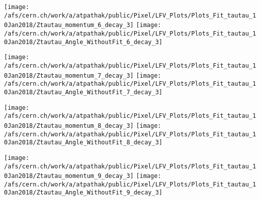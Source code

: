 \documentclass{beamer}
\begin{document}
\begin{frame}
\begin{normalsize}
\begin{center}
\texttt{[image: /afs/cern.ch/work/a/atpathak/public/Pixel/LFV\_Plots/Plots\_Fit\_tautau\_10Jan2018/Ztautau\_momentum\_6\_decay\_3]}
\texttt{[image: /afs/cern.ch/work/a/atpathak/public/Pixel/LFV\_Plots/Plots\_Fit\_tautau\_10Jan2018/Ztautau\_Angle\_WithoutFit\_6\_decay\_3]} 
\end{center}
\end{normalsize}
\end {frame}
\begin{frame}
\begin{normalsize}
\begin{center}
\texttt{[image: /afs/cern.ch/work/a/atpathak/public/Pixel/LFV\_Plots/Plots\_Fit\_tautau\_10Jan2018/Ztautau\_momentum\_7\_decay\_3]}
\texttt{[image: /afs/cern.ch/work/a/atpathak/public/Pixel/LFV\_Plots/Plots\_Fit\_tautau\_10Jan2018/Ztautau\_Angle\_WithoutFit\_7\_decay\_3]} 
\end{center}
\end{normalsize}
\end {frame}
\begin{frame}
\begin{normalsize}
\begin{center}
\texttt{[image: /afs/cern.ch/work/a/atpathak/public/Pixel/LFV\_Plots/Plots\_Fit\_tautau\_10Jan2018/Ztautau\_momentum\_8\_decay\_3]}
\texttt{[image: /afs/cern.ch/work/a/atpathak/public/Pixel/LFV\_Plots/Plots\_Fit\_tautau\_10Jan2018/Ztautau\_Angle\_WithoutFit\_8\_decay\_3]} 
\end{center}
\end{normalsize}
\end {frame}
\begin{frame}
\begin{normalsize}
\begin{center}
\texttt{[image: /afs/cern.ch/work/a/atpathak/public/Pixel/LFV\_Plots/Plots\_Fit\_tautau\_10Jan2018/Ztautau\_momentum\_9\_decay\_3]}
\texttt{[image: /afs/cern.ch/work/a/atpathak/public/Pixel/LFV\_Plots/Plots\_Fit\_tautau\_10Jan2018/Ztautau\_Angle\_WithoutFit\_9\_decay\_3]} 
\end{center}
\end{normalsize}
\end {frame}
\end{document}
